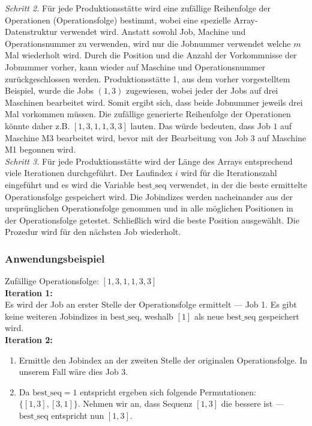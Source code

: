 \documentclass[final, english, ngerman, a4paper, 12pt, %
numbers=noenddot,
cd=true,
cdfont=false,cdfont=nohead,cdfont=nodin,
cdmath=false,
cdhead=false,
cdfoot=true,
cdcover=monochrome,
cdgeometry=symmetric,
declaration=heading,
declaration=notoc,
abstract=heading,
]{tudscrreprt}
\begin{document}
\noindent
\textit{Schritt 2.} Für jede Produktionsstätte wird eine zufällige Reihenfolge der Operationen (Operationsfolge) bestimmt, wobei eine spezielle Array-Datenstruktur verwendet wird. Anstatt sowohl Job, Machine und Operationsnummer zu verwenden, wird nur die Jobnummer verwendet welche $m$ Mal wiederholt wird. Durch die Position und die Anzahl der Vorkommnisse der Jobnummer vorher, kann wieder auf Maschine und Operationsnummer zurückgeschlossen werden. Produktionsstätte 1, aus dem vorher vorgestelltem Beispiel, wurde die Jobs $(1, 3)$ zugewiesen, wobei jeder der Jobs auf drei Maschinen bearbeitet wird. Somit ergibt sich, dass beide Jobnummer jeweils drei Mal vorkommen müssen. Die zufällige generierte Reihenfolge der Operationen könnte daher z.B. $[1,3,1,1,3,3]$ lauten. Das würde bedeuten, dass Job $1$ auf Maschine M3 bearbeitet wird, bevor mit der Bearbeitung von Job $3$ auf Maschine M1 begonnen wird.\\

\noindent
\textit{Schritt 3.} Für jede Produktionsstätte wird der Länge des Arrays entsprechend viele Iterationen durchgeführt. Der Laufindex $i$ wird für die Iterationszahl eingeführt und es wird die Variable $\text{best\_seq}$ verwendet, in der die beste ermittelte Operationsfolge gespeichert wird. Die Jobindizes werden nacheinander aus der ursprünglichen Operationsfolge genommen und in alle möglichen Positionen in der Operationsfolge getestet. Schließlich wird die beste Position ausgewählt. Die Prozedur wird für den nächsten Job wiederholt.

\subsubsection{Anwendungsbeispiel}
\noindent
Zufällige Operationsfolge: $[1,3,1,1,3,3]$\\

\noindent
\textbf{Iteration 1:}\\
\noindent
Es wird der Job an erster Stelle der Operationsfolge ermittelt — Job 1. Es gibt keine weiteren Jobindizes in $\text{best\_seq}$, weshalb $[1]$ als neue $\text{best\_seq}$ gespeichert wird.\\


\noindent
\textbf{Iteration 2:}
\begin{enumerate}
	\item Ermittle den Jobindex an der zweiten Stelle der originalen Operationsfolge. In unserem Fall wäre dies Job $3$.
	\item Da $\text{best\_seq}= 1$ entspricht ergeben sich folgende Permutationen: $\{ [1,3], [3,1] \}$. Nehmen wir an, dass Sequenz $[1,3]$ die bessere ist — $\text{best\_seq}$ entspricht nun $[1,3]$.
\end{enumerate}
\end{document}
